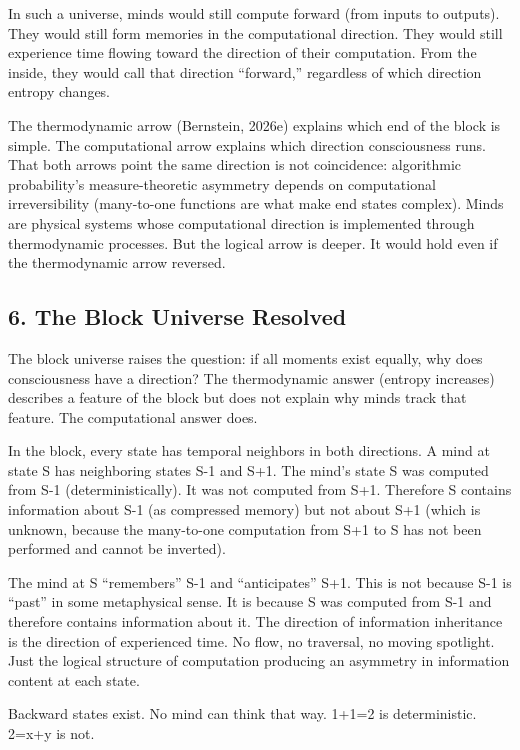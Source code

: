 \documentclass[
]{article}
\begin{document}
In such a universe, minds would still compute forward (from inputs to
outputs). They would still form memories in the computational direction.
They would still experience time flowing toward the direction of their
computation. From the inside, they would call that direction
``forward,'' regardless of which direction entropy changes.

The thermodynamic arrow (Bernstein, 2026e) explains which end of the
block is simple. The computational arrow explains which direction
consciousness runs. That both arrows point the same direction is not
coincidence: algorithmic probability's measure-theoretic asymmetry
depends on computational irreversibility (many-to-one functions are what
make end states complex). Minds are physical systems whose computational
direction is implemented through thermodynamic processes. But the
logical arrow is deeper. It would hold even if the thermodynamic arrow
reversed.

\subsection{6. The Block Universe
Resolved}\label{the-block-universe-resolved}

The block universe raises the question: if all moments exist equally,
why does consciousness have a direction? The thermodynamic answer
(entropy increases) describes a feature of the block but does not
explain why minds track that feature. The computational answer does.

In the block, every state has temporal neighbors in both directions. A
mind at state S has neighboring states S-1 and S+1. The mind's state S
was computed from S-1 (deterministically). It was not computed from S+1.
Therefore S contains information about S-1 (as compressed memory) but
not about S+1 (which is unknown, because the many-to-one computation
from S+1 to S has not been performed and cannot be inverted).

The mind at S ``remembers'' S-1 and ``anticipates'' S+1. This is not
because S-1 is ``past'' in some metaphysical sense. It is because S was
computed from S-1 and therefore contains information about it. The
direction of information inheritance is the direction of experienced
time. No flow, no traversal, no moving spotlight. Just the logical
structure of computation producing an asymmetry in information content
at each state.

Backward states exist. No mind can think that way. 1+1=2 is
deterministic. 2=x+y is not.
\end{document}
